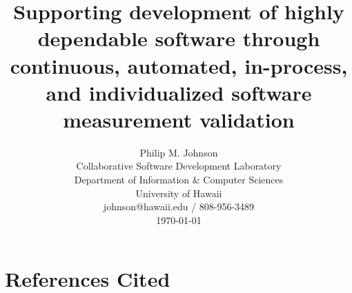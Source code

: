 







\title{Supporting development of highly dependable software through 
  continuous, automated, in-process, and individualized software measurement validation
 }

\author{
        \hspace*{-2ex}
        \parbox{4.0in} {\begin{center}
        Philip M. Johnson\\ 
        Collaborative Software Development Laboratory\\
        Department of Information \& Computer Sciences\\
        University of Hawaii\\
        johnson@hawaii.edu / 808-956-3489 \\ \protect\medskip \today
        \end{center} }
}

\maketitle

\pagestyle{plain}

\tableofcontents


\section*{References Cited}



%
%





